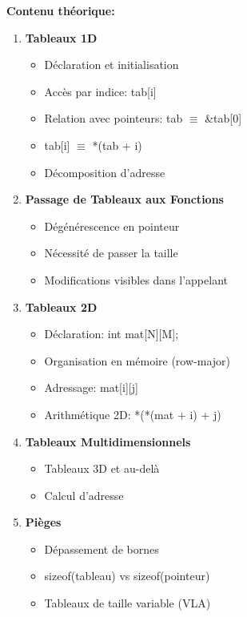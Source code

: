 \documentclass[10pt,a4paper]{article}
\begin{document}
\textbf{Contenu théorique:}
\begin{enumerate}
\item \textbf{Tableaux 1D}
   \begin{itemize}
   \item Déclaration et initialisation
   \item Accès par indice: tab[i]
   \item Relation avec pointeurs: tab $\equiv$ \&tab[0]
   \item tab[i] $\equiv$ *(tab + i)
   \item Décomposition d'adresse
   \end{itemize}

\item \textbf{Passage de Tableaux aux Fonctions}
   \begin{itemize}
   \item Dégénérescence en pointeur
   \item Nécessité de passer la taille
   \item Modifications visibles dans l'appelant
   \end{itemize}

\item \textbf{Tableaux 2D}
   \begin{itemize}
   \item Déclaration: int mat[N][M];
   \item Organisation en mémoire (row-major)
   \item Adressage: mat[i][j]
   \item Arithmétique 2D: *(*(mat + i) + j)
   \end{itemize}

\item \textbf{Tableaux Multidimensionnels}
   \begin{itemize}
   \item Tableaux 3D et au-delà
   \item Calcul d'adresse
   \end{itemize}

\item \textbf{Pièges}
   \begin{itemize}
   \item Dépassement de bornes
   \item sizeof(tableau) vs sizeof(pointeur)
   \item Tableaux de taille variable (VLA)
   \end{itemize}
\end{enumerate}
\end{document}
